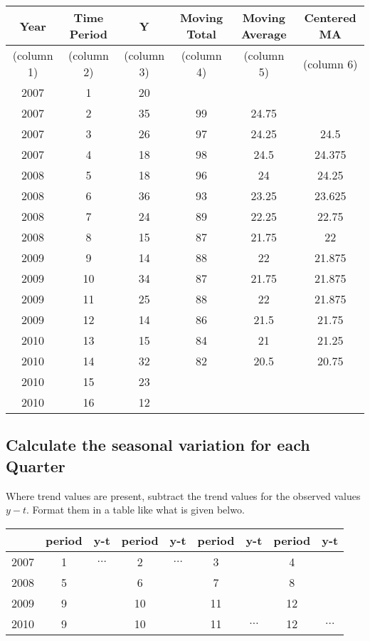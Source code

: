 \documentclass[12pts]{article}
\begin{document}
\begin{tabular}{|c|c|c|c|c|c|} 
\hline
Year	&	Time Period	&	Y	&	Moving Total	&	Moving Average	&	Centered MA	\\	\hline
(column 1)	&	(column 2)	&	(column 3)	&	(column 4)	&	(column 5)	&	(column 6)	\\	\hline
2007	&	1	&	20	&		&		&		\\	\hline
2007	&	2	&	35	&	99	&	24.75	&		\\	\hline
2007	&	3	&	26	&	97	&	24.25	&	24.5	\\	\hline
2007	&	4	&	18	&	98	&	24.5	&	24.375	\\	\hline
2008	&	5	&	18	&	96	&	24	&	24.25	\\	\hline
2008	&	6	&	36	&	93	&	23.25	&	23.625	\\	\hline
2008	&	7	&	24	&	89	&	22.25	&	22.75	\\	\hline
2008	&	8	&	15	&	87	&	21.75	&	22	\\	\hline
2009	&	9	&	14	&	88	&	22	&	21.875	\\	\hline
2009	&	10	&	34	&	87	&	21.75	&	21.875	\\	\hline
2009	&	11	&	25	&	88	&	22	&	21.875	\\	\hline
2009	&	12	&	14	&	86	&	21.5	&	21.75	\\	\hline
2010	&	13	&	15	&	84	&	21	&	21.25	\\	\hline
2010	&	14	&	32	&	82	&	20.5	&	20.75	\\	\hline
2010	&	15	&	23	&		&		&		\\	\hline
2010	&	16	&	12	&		&		&		\\	\hline
\end{tabular} 


\newpage
\subsection*{Calculate the seasonal variation for each Quarter}
Where trend values are present, subtract the trend values for the observed values $y-t$. Format them in a table like what is given belwo.

\begin{center}
\begin{tabular}{|c|c|c|c|c|c|c|c|c|}
\hline  & period & \phantom{spa} y-t \phantom{spa} & period & \phantom{spa} y-t \phantom{spa} & period & \phantom{spa} y-t \phantom{spa} & period & \phantom{spa} y-t \phantom{spa} \\ 
\hline 2007  & 1 & $\ldots$ & 2 & $\ldots$ & 3 &  & 4 &  \\ 
\hline 2008 & 5 &  & 6 &  & 7 &  & 8 &  \\ 
\hline 2009 & 9 &  & 10 &  & 11 &  & 12 &  \\
\hline 2010 & 9 &  & 10 &  & 11 & $\ldots$ & 12 & $\ldots$  \\ 
\hline 
\end{tabular} 
\end{center}
\end{document}
